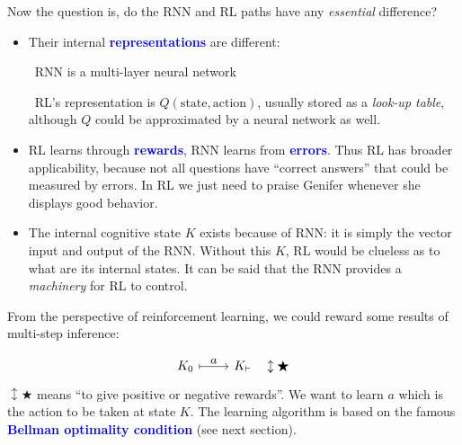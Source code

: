 \documentclass[orivec]{llncs}
\newcommand{\emp}[1]{\textbf{\textcolor{blue}{#1}}}
\newcommand{\dashh}{\textemdash~}
\begin{document}
Now the question is, do the RNN and RL paths have any \textit{essential} difference?
\begin{itemize}
\item Their internal \emp{representations} are different:\par
\dashh RNN is a multi-layer neural network\par
\dashh RL's representation is $Q(\mbox{state},\mbox{action})$, usually stored as a \textit{look-up table}, although $Q$ could be approximated by a neural network as well.
\item RL learns through \emp{rewards}, RNN learns from \emp{errors}.  Thus RL has broader applicability, because not all questions have ``correct answers'' that could be measured by errors.  In RL we just need to praise Genifer whenever she displays good behavior.
\item The internal cognitive state $K$ exists because of RNN:  it is simply the vector input and output of the RNN.  Without this $K$, RL would be clueless as to what are its internal states.  It can be said that the RNN provides a \textit{machinery} for RL to control.
\end{itemize}





From the perspective of reinforcement learning, we could reward some results of multi-step inference: \par
\begin{equation}
\begin{tikzcd}[row sep=tiny]
K_0 \arrow[r, mapsto, "\scalebox{1.3}{$a$}"] & K_\vdash \quad \updownarrow \bigstar
\end{tikzcd}
\end{equation}
$\updownarrow \bigstar$ means ``to give positive or negative rewards''.  We want to learn $a$ which is the action to be taken at state $K$.  The learning algorithm is based on the famous \emp{Bellman optimality condition} (see next section).
\end{document}
